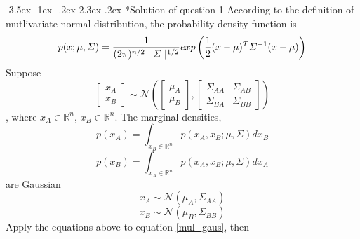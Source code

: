 \documentclass[12pt]{article}
\makeatletter
\renewcommand\section{\@startsection {section}{1}{\z@}%
	{-3.5ex \@plus -1ex \@minus -.2ex}%
	{2.3ex \@plus.2ex}%
	{\normalfont\large\bfseries}}%
\makeatother
\begin{document}
	\section*{Solution of question 1}
	According to the definition of mutlivariate normal distribution, the probability density function is
	\begin{equation}{\label{mul_gaus}}
		p(x;\mu,\varSigma)=\frac{1}{(2\pi)^{n/2}\mid\varSigma\mid^{1/2}}exp\left(\frac{1}{2}(x-\mu)^T\varSigma^{-1}(x-\mu)\right)
	\end{equation}
	Suppose 
	\begin{equation}
		\left[
		\begin{array}{c}  
			x_A\\
			x_B
		\end{array}
		\right]
		\sim\mathcal{N}
		\left(
			\left[
			\begin{array}{c}
				\mu_A\\
				\mu_B
			\end{array}
			\right],
			\left[
			\begin{array}{cc}
				\varSigma_{AA} & \varSigma_{AB}\\
				\varSigma_{BA} & \varSigma_{BB}
			\end{array}
			\right]
		\right)		
	\end{equation}
	, where $x_A\in \mathbb{R}^n$, $x_B\in \mathbb{R}^n$. The marginal densities,
	\begin{equation}
		p(x_A)=\int_{x_B\in \mathbb{R}^n}p(x_A,x_B;\mu,\varSigma)dx_B
	\end{equation}
	\begin{equation}
		p(x_B)=\int_{x_A\in \mathbb{R}^n}p(x_A,x_B;\mu,\varSigma)dx_A
	\end{equation}
	are Gaussian
	\begin{equation}
		x_A\sim\mathcal{N}(\mu_A,\varSigma_{AA})
	\end{equation}
	\begin{equation}
		x_B\sim\mathcal{N}(\mu_B,\varSigma_{BB})
	\end{equation}
	\noindent
	Apply the equations above to equation \ref{mul_gaus}, then
\end{document}
